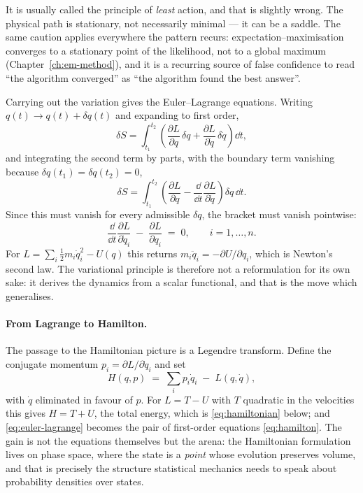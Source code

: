 \begin{remark}
It is usually called the principle of \emph{least} action, and that is
slightly wrong. The physical path is stationary, not necessarily minimal ---
it can be a saddle. The same caution applies everywhere the pattern recurs:
expectation--maximisation converges to a stationary point of the likelihood,
not to a global maximum (Chapter~\ref{ch:em-method}), and it is a recurring
source of false confidence to read ``the algorithm converged'' as ``the
algorithm found the best answer''.
\end{remark}

Carrying out the variation gives the Euler--Lagrange equations. Writing
$q(t) \to q(t) + \delta q(t)$ and expanding to first order,
\[
  \delta S = \int_{t_1}^{t_2}
  \left(\frac{\partial L}{\partial q}\,\delta q
      + \frac{\partial L}{\partial \dot q}\,\delta \dot q\right)\dd t ,
\]
and integrating the second term by parts, with the boundary term vanishing
because $\delta q(t_1) = \delta q(t_2) = 0$,
\[
  \delta S = \int_{t_1}^{t_2}
  \left(\frac{\partial L}{\partial q}
      - \frac{\dd}{\dd t}\frac{\partial L}{\partial \dot q}\right)\delta q \,\dd t .
\]
Since this must vanish for every admissible $\delta q$, the bracket must
vanish pointwise:
\begin{equation}
  \frac{\dd}{\dd t}\frac{\partial L}{\partial \dot q_i}
  \;-\; \frac{\partial L}{\partial q_i} \;=\; 0,
  \qquad i = 1, \dots, n.
  \label{eq:euler-lagrange}
\end{equation}
For $L = \sum_i \tfrac12 m_i \dot q_i^2 - U(q)$ this returns
$m_i \ddot q_i = -\partial U/\partial q_i$, which is Newton's second law. The
variational principle is therefore not a reformulation for its own sake: it
derives the dynamics from a scalar functional, and that is the move which
generalises.

\paragraph{From Lagrange to Hamilton.} The passage to the Hamiltonian
picture is a Legendre transform. Define the conjugate momentum
$p_i = \partial L/\partial \dot q_i$ and set
\begin{equation}
  H(q,p) \;=\; \sum_i p_i \dot q_i \;-\; L(q,\dot q),
  \label{eq:legendre}
\end{equation}
with $\dot q$ eliminated in favour of $p$. For $L = T - U$ with $T$ quadratic
in the velocities this gives $H = T + U$, the total energy, which is
\eqref{eq:hamiltonian} below; and \eqref{eq:euler-lagrange} becomes the pair
of first-order equations \eqref{eq:hamilton}. The gain is not the equations
themselves but the arena: the Hamiltonian formulation lives on phase space,
where the state is a \emph{point} whose evolution preserves volume, and that
is precisely the structure statistical mechanics needs to speak about
probability densities over states.

